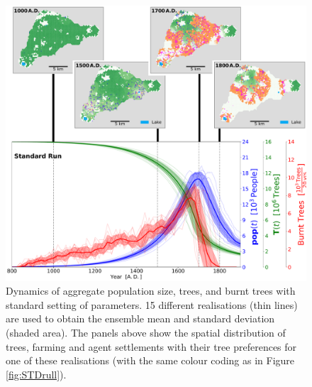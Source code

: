 \begin{figure}
	\centering
	\includegraphics[width=1.\linewidth, center]{images/Results/Standard/EnsembleStatistics+Panels}
	\caption{Dynamics of aggregate population size, trees, and burnt trees with standard setting of parameters. 15 different realisations (thin lines) are used to obtain the ensemble mean and standard deviation (shaded area). The panels above show the spatial distribution of trees, farming and agent settlements with their tree preferences for one of these realisations (with the same colour coding as in Figure \ref{fig:STDrull}).}
	\label{fig:STDstats}
\end{figure}


